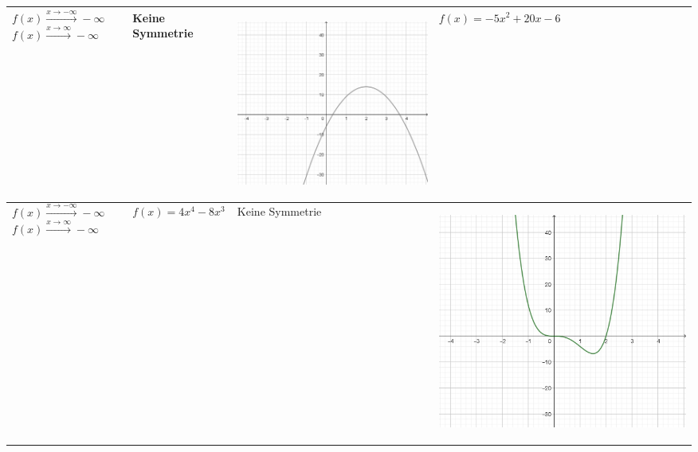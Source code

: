 \documentclass[oneside,openany,headings=optiontotoc,11pt,numbers=noenddot]{scrreprt}
\begin{document}
\begin{table}
\begin{tabular}{|M{4.35cm}|M{4.35cm}||M{4.35cm}|M{4.25cm}|}
			\hline
			 & Keine Symmetrie
			&  \begin{center}\includegraphics[scale=0.15]{04-GanzrationaleFunktionen/s1.jpg}\end{center} & \(f(x)=-5x^2 + 20x - 6\) \\
			\hline
			 &\(f(x)=4x^4 - 8x^3\)  & Keine Symmetrie &  \begin{center}\includegraphics[scale=0.15]{04-GanzrationaleFunktionen/t1.jpg}\end{center}\\

\end{tabular}
\end{table}
\end{document}
